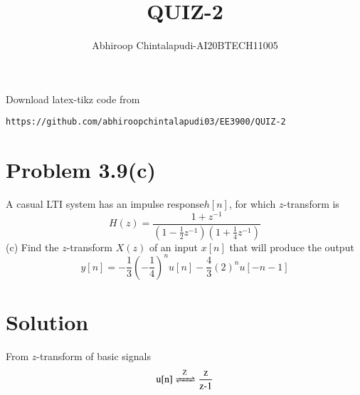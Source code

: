 \documentclass[journal,12pt,twocolumn]{IEEEtran}
\begin{document}
     \def\rightbox#1{\makebox[0in][r]{#1}}
     \def\centbox#1{\makebox[0in]{#1}}
     \def\topbox#1{\raisebox{-\baselineskip}[0in][0in]{#1}}
     \def\midbox#1{\raisebox{-0.5\baselineskip}[0in][0in]{#1}}
\vspace{3cm}
\title{QUIZ-2}
\author{Abhiroop Chintalapudi-AI20BTECH11005}
\maketitle
\newpage
\bigskip
\renewcommand{\thefigure}{\theenumi}
\renewcommand{\thetable}{\theenumi}
Download latex-tikz code from  
\begin{lstlisting}
https://github.com/abhiroopchintalapudi03/EE3900/QUIZ-2
\end{lstlisting}

\section{Problem 3.9(c)}
A casual LTI system has an impulse response$h[n]$, for which $z$-transform is\\
\begin{equation}
H(z)=\frac{1+z^{-1}}{(1- \frac{1}{2}z^{-1})(1+\frac{1}{4}z^{-1})} \label{eq3.9.1}
\end{equation}
(c) Find the $z$-transform $X(z)$ of an input $x[n]$ that will produce the output\\
\begin{equation}
y[n]=-\frac{1}{3}(-\frac{1}{4})^{n}u[n] - \frac{4}{3}(2)^{n}u[-n-1]  \label{eq3.9.2}
\end{equation}
\section{Solution}
From $z$-transform of basic signals\\
\begin{align}
\ce{u[n] <=>[Z] \frac{z}{z-1}}\\
\end{align}
\end{document}
